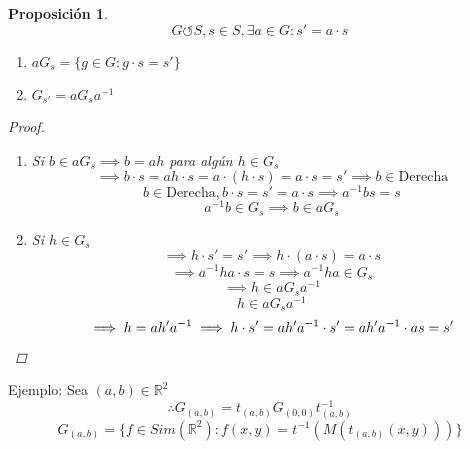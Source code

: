 \documentclass[11pt]{book}
\newtheorem{prop}[thm]{Proposición}
\theoremstyle{definition}
\begin{document}
\begin{prop}
	\[G\circlearrowleft S, s\in S,\exists a\in G: s'=a\cdot s\]
	\begin{enumerate}[label=(\alph*)]
		\item $aG_s=\{g\in G:g\cdot s=s'\}$

		\item $G_{s'}=aG_sa^{-1}$
	\end{enumerate}
	\begin{proof}
		\begin{enumerate}[label=(\alph*)]
			\item Si $b\in aG_s\implies b=ah$ para algún $h\in G_s$
			\[\implies b\cdot s=ah\cdot s= a\cdot(h\cdot s)=a\cdot s= s'\implies b\in\textrm{Derecha}\]
			\[ b\in\textrm{Derecha}, b\cdot s=s'=a\cdot s\implies a^{-1}bs=s\]
			\[a^{-1}b\in G_s\implies b\in aG_s\]

			\item Si $h\in G_s$
			\[\implies h\cdot s'=s'\implies h\cdot(a\cdot s)=a\cdot s\]
			\[\implies a^{-1}ha\cdot s=s\implies a^{-1}ha\in G_s\]
			\[\implies h\in aG_sa^{-1}\]
			\[h\in aG_sa^{-1}\]
			\[\implies h=ah'a^{-1}\implies h\cdot s'=ah'a^{-1}\cdot s'=ah'a^{-1}\cdot as=s'\qedhere\]
		\end{enumerate}
	\end{proof}
\end{prop}
Ejemplo: Sea $(a,b)\in\mathbb{R}^2$
\[\therefore G_{(a,b)}=t_{(a,b)}G_{(0,0)}t^{-1}_{(a,b)}\]
\[G_{(a,b)}=\{f\in Sim(\mathbb{R}^2):f(x,y)=t^{-1}(M(t_{(a,b)}(x,y)))\}\]
\end{document}
